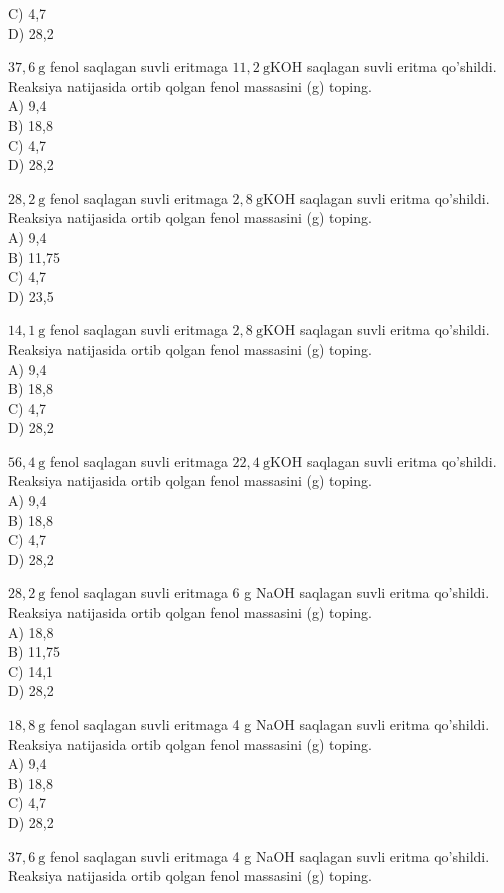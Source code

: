 C) 4,7\\
D) 28,2
  \item $37,6 \mathrm{~g}$ fenol saqlagan suvli eritmaga $11,2 \mathrm{~g} \mathrm{KOH}$ saqlagan suvli eritma qo'shildi. Reaksiya natijasida ortib qolgan fenol massasini (g) toping.\\
A) 9,4\\
B) 18,8\\
C) 4,7\\
D) 28,2
  \item $28,2 \mathrm{~g}$ fenol saqlagan suvli eritmaga $2,8 \mathrm{~g} \mathrm{KOH}$ saqlagan suvli eritma qo'shildi. Reaksiya natijasida ortib qolgan fenol massasini (g) toping.\\
A) 9,4\\
B) 11,75\\
C) 4,7\\
D) 23,5
  \item $14,1 \mathrm{~g}$ fenol saqlagan suvli eritmaga $2,8 \mathrm{~g} \mathrm{KOH}$ saqlagan suvli eritma qo'shildi. Reaksiya natijasida ortib qolgan fenol massasini (g) toping.\\
A) 9,4\\
B) 18,8\\
C) 4,7\\
D) 28,2
  \item $56,4 \mathrm{~g}$ fenol saqlagan suvli eritmaga $22,4 \mathrm{~g} \mathrm{KOH}$ saqlagan suvli eritma qo'shildi. Reaksiya natijasida ortib qolgan fenol massasini (g) toping.\\
A) 9,4\\
B) 18,8\\
C) 4,7\\
D) 28,2
  \item $28,2 \mathrm{~g}$ fenol saqlagan suvli eritmaga 6 g NaOH saqlagan suvli eritma qo'shildi. Reaksiya natijasida ortib qolgan fenol massasini (g) toping.\\
A) 18,8\\
B) 11,75\\
C) 14,1\\
D) 28,2
  \item $18,8 \mathrm{~g}$ fenol saqlagan suvli eritmaga 4 g NaOH saqlagan suvli eritma qo'shildi. Reaksiya natijasida ortib qolgan fenol massasini (g) toping.\\
A) 9,4\\
B) 18,8\\
C) 4,7\\
D) 28,2
  \item $37,6 \mathrm{~g}$ fenol saqlagan suvli eritmaga 4 g NaOH saqlagan suvli eritma qo'shildi. Reaksiya natijasida ortib qolgan fenol massasini (g) toping.\\
